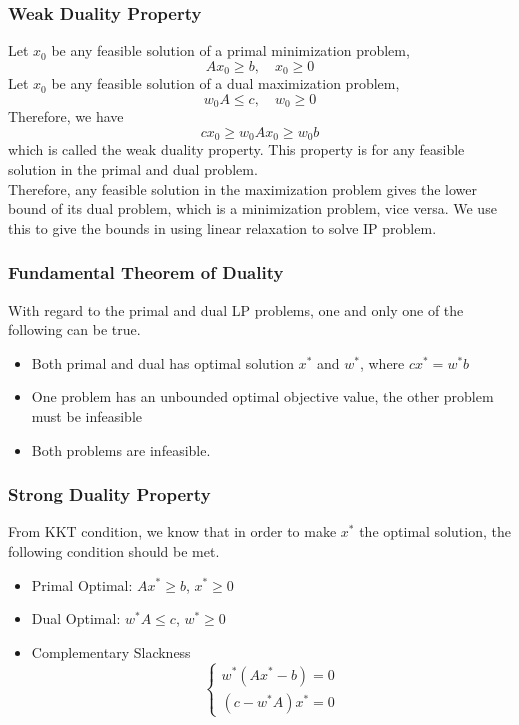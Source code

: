 					\subsubsection{Weak Duality Property}
						Let $x_0$ be any feasible solution of a primal minimization problem,
						\begin{equation}
							Ax_0 \ge b, \quad x_0\ge 0 
						\end{equation}
						Let $x_0$ be any feasible solution of a dual maximization problem,
						\begin{equation}
							w_0A \le c, \quad w_0\ge 0 
						\end{equation}
						Therefore, we have
						\begin{equation}
							cx_0 \ge w_0Ax_0 \ge w_0b 
						\end{equation}
						which is called the weak duality property. This property is for any feasible solution in the primal and dual problem.\\
						Therefore, any feasible solution in the maximization problem gives the lower bound of its dual problem, which is a minimization problem, vice versa. We use this to give the bounds in using linear relaxation to solve IP problem.

					\subsubsection{Fundamental Theorem of Duality}
						With regard to the primal and dual LP problems, one and only one of the following can be true.
						\begin{itemize}
							\item Both primal and dual has optimal solution $x^*$ and $w^*$, where $cx^* = w^*b$
							\item One problem has an unbounded optimal objective value, the other problem must be infeasible
							\item Both problems are infeasible.
						\end{itemize}

					\subsubsection{Strong Duality Property}
						From KKT condition, we know that in order to make $x^*$ the optimal solution, the following condition should be met.
						\begin{itemize}
							\item Primal Optimal: $Ax^* \ge b$, $x^*\ge 0$
							\item Dual Optimal: $w^*A \le c$, $w^*\ge 0$
							\item Complementary Slackness
							\begin{equation}
								\begin{cases}
									w^*(Ax^*-b) = 0\\
									(c-w^*A)x^* = 0
								\end{cases} 
							\end{equation}
						\end{itemize}
						
